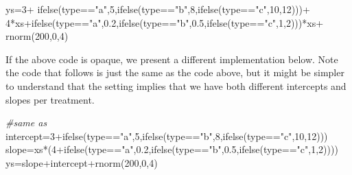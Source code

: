 \documentclass[
]{book}
\newenvironment{Shaded}{\begin{snugshade}}{\end{snugshade}}
\newcommand{\CommentTok}[1]{\textcolor[rgb]{0.56,0.35,0.01}{\textit{#1}}}
\newcommand{\DecValTok}[1]{\textcolor[rgb]{0.00,0.00,0.81}{#1}}
\newcommand{\FloatTok}[1]{\textcolor[rgb]{0.00,0.00,0.81}{#1}}
\newcommand{\FunctionTok}[1]{\textcolor[rgb]{0.00,0.00,0.00}{#1}}
\newcommand{\NormalTok}[1]{#1}
\newcommand{\OtherTok}[1]{\textcolor[rgb]{0.56,0.35,0.01}{#1}}
\newcommand{\SpecialCharTok}[1]{\textcolor[rgb]{0.00,0.00,0.00}{#1}}
\newcommand{\StringTok}[1]{\textcolor[rgb]{0.31,0.60,0.02}{#1}}
\begin{document}
\begin{Shaded}
\begin{Highlighting}[]
\NormalTok{ys}\OtherTok{=}\DecValTok{3}\SpecialCharTok{+}
\FunctionTok{ifelse}\NormalTok{(type}\SpecialCharTok{==}\StringTok{"a"}\NormalTok{,}\DecValTok{5}\NormalTok{,}\FunctionTok{ifelse}\NormalTok{(type}\SpecialCharTok{==}\StringTok{"b"}\NormalTok{,}\DecValTok{8}\NormalTok{,}\FunctionTok{ifelse}\NormalTok{(type}\SpecialCharTok{==}\StringTok{"c"}\NormalTok{,}\DecValTok{10}\NormalTok{,}\DecValTok{12}\NormalTok{)))}\SpecialCharTok{+}
\DecValTok{4}\SpecialCharTok{*}\NormalTok{xs}\SpecialCharTok{+}\FunctionTok{ifelse}\NormalTok{(type}\SpecialCharTok{==}\StringTok{"a"}\NormalTok{,}\FloatTok{0.2}\NormalTok{,}\FunctionTok{ifelse}\NormalTok{(type}\SpecialCharTok{==}\StringTok{"b"}\NormalTok{,}\FloatTok{0.5}\NormalTok{,}\FunctionTok{ifelse}\NormalTok{(type}\SpecialCharTok{==}\StringTok{"c"}\NormalTok{,}\DecValTok{1}\NormalTok{,}\DecValTok{2}\NormalTok{)))}\SpecialCharTok{*}\NormalTok{xs}\SpecialCharTok{+}
\FunctionTok{rnorm}\NormalTok{(}\DecValTok{200}\NormalTok{,}\DecValTok{0}\NormalTok{,}\DecValTok{4}\NormalTok{)}
\end{Highlighting}
\end{Shaded}

If the above code is opaque, we present a different implementation below. Note the code that follows is just the same as the code above, but it might be simpler to understand that the setting implies that we have both different intercepts and slopes per treatment.

\begin{Shaded}
\begin{Highlighting}[]
\CommentTok{\#same as}
\NormalTok{intercept}\OtherTok{=}\DecValTok{3}\SpecialCharTok{+}\FunctionTok{ifelse}\NormalTok{(type}\SpecialCharTok{==}\StringTok{"a"}\NormalTok{,}\DecValTok{5}\NormalTok{,}\FunctionTok{ifelse}\NormalTok{(type}\SpecialCharTok{==}\StringTok{"b"}\NormalTok{,}\DecValTok{8}\NormalTok{,}\FunctionTok{ifelse}\NormalTok{(type}\SpecialCharTok{==}\StringTok{"c"}\NormalTok{,}\DecValTok{10}\NormalTok{,}\DecValTok{12}\NormalTok{)))}
\NormalTok{slope}\OtherTok{=}\NormalTok{xs}\SpecialCharTok{*}\NormalTok{(}\DecValTok{4}\SpecialCharTok{+}\FunctionTok{ifelse}\NormalTok{(type}\SpecialCharTok{==}\StringTok{"a"}\NormalTok{,}\FloatTok{0.2}\NormalTok{,}\FunctionTok{ifelse}\NormalTok{(type}\SpecialCharTok{==}\StringTok{"b"}\NormalTok{,}\FloatTok{0.5}\NormalTok{,}\FunctionTok{ifelse}\NormalTok{(type}\SpecialCharTok{==}\StringTok{"c"}\NormalTok{,}\DecValTok{1}\NormalTok{,}\DecValTok{2}\NormalTok{))))}
\NormalTok{ys}\OtherTok{=}\NormalTok{slope}\SpecialCharTok{+}\NormalTok{intercept}\SpecialCharTok{+}\FunctionTok{rnorm}\NormalTok{(}\DecValTok{200}\NormalTok{,}\DecValTok{0}\NormalTok{,}\DecValTok{4}\NormalTok{)}
\end{Highlighting}
\end{Shaded}
\end{document}
